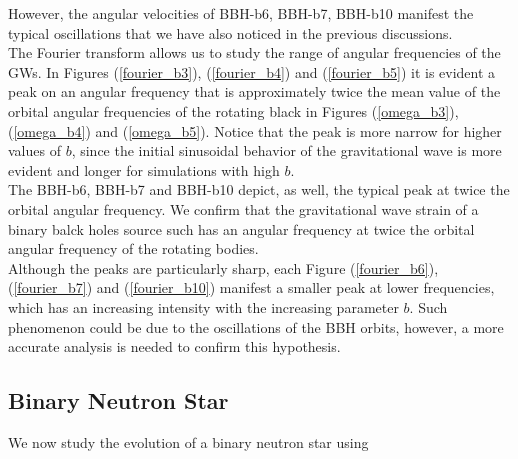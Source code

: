 However, the angular velocities of BBH-b6, BBH-b7, BBH-b10 manifest the typical oscillations that we have also noticed in the previous discussions.\\
The Fourier transform allows us to study the range of angular frequencies of the GWs.
In Figures (\ref{fourier_b3}), (\ref{fourier_b4}) and (\ref{fourier_b5}) it is evident a peak on an angular frequency that is approximately twice the mean value of the orbital angular frequencies of the rotating black in Figures (\ref{omega_b3}), (\ref{omega_b4}) and (\ref{omega_b5}).
Notice that the peak is more narrow for higher values of $b$, since the initial sinusoidal behavior of the gravitational wave is more evident and longer for simulations with high $b$.\\
The BBH-b6, BBH-b7 and BBH-b10 depict, as well, the typical peak at twice the orbital angular frequency.
We confirm that the gravitational wave strain of a binary balck holes source such has an angular frequency at twice the orbital angular frequency of the rotating bodies.\\
Although the peaks are particularly sharp,  each Figure (\ref{fourier_b6}), (\ref{fourier_b7}) and (\ref{fourier_b10}) manifest a smaller peak at lower frequencies, which has an increasing intensity with the increasing parameter $b$.
Such phenomenon could be due to the oscillations of the BBH orbits, however, a more accurate analysis is needed to confirm this hypothesis.\\

\pagebreak

\subsection{Binary Neutron Star}
We now study the evolution of a binary neutron star using 



